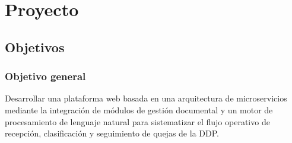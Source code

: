 \chapter{Proyecto}
\label{cap:proyecto}

\section{Objetivos}
\label{sec:objetivos}

\subsection{Objetivo general}
Desarrollar una plataforma web basada en una arquitectura de microservicios mediante la integración de módulos de gestión documental y un motor de procesamiento de lenguaje natural para sistematizar el flujo operativo de recepción, clasificación y seguimiento de quejas de la DDP.

